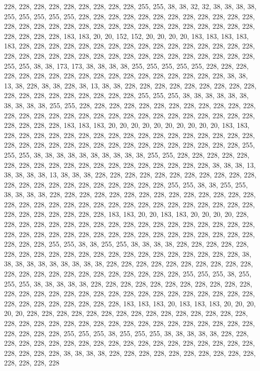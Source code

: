 {	228, 228, 228, 228, 228, 228, 228, 228, 228, 255, 255, 38,  38,  32,  32,  38,  38,  38,  38,  255, 255, 255, 255, 255, 228, 228, 228, 228, 228, 228, 228, 228, 228, 228, 228, 228, 228, 228, 228, 228, 228, 228, 228, 228, 228, 228, 228, 228, 228, 228, 228, 228, 228, 228, 228, 228, 228, 183, 183, 20,  20,  152, 152, 20,  20,  20,  20,  183, 183, 183, 183, 183, 228, 228, 228, 228, 228, 228, 228, 228, 228, 228, 228, 228, 228, 228, 228, 228, 228, 228, 228, 228, 228, 228, 228, 228, 228, 228, 228, 228, 228, 228, 228, 228, 228, 255, 255, 38,  38,  173, 173, 38,  38,  38,  38,  255, 255, 255, 255, 255, 228, 228, 228, 228, 228, 228, 228, 228, 228, 228, 228, 228, 228, 228, 228, 228, 228, 228, 38,  38,  13,  38,  228, 38,  38,  228, 38,  13,  38,  38,  228, 228, 228, 228, 228, 228, 228, 228, 228, 228, 
	228, 228, 228, 228, 228, 228, 228, 228, 255, 255, 255, 38,  38,  38,  38,  38,  38,  38,  38,  38,  38,  255, 255, 228, 228, 228, 228, 228, 228, 228, 228, 228, 228, 228, 228, 228, 228, 228, 228, 228, 228, 228, 228, 228, 228, 228, 228, 228, 228, 228, 228, 228, 228, 228, 228, 228, 183, 183, 183, 20,  20,  20,  20,  20,  20,  20,  20,  20,  20,  183, 183, 228, 228, 228, 228, 228, 228, 228, 228, 228, 228, 228, 228, 228, 228, 228, 228, 228, 228, 228, 228, 228, 228, 228, 228, 228, 228, 228, 228, 228, 228, 228, 228, 228, 255, 255, 255, 38,  38,  38,  38,  38,  38,  38,  38,  38,  38,  255, 255, 228, 228, 228, 228, 228, 228, 228, 228, 228, 228, 228, 228, 228, 228, 228, 228, 228, 228, 228, 38,  38,  38,  13,  38,  38,  38,  38,  13,  38,  38,  38,  228, 228, 228, 228, 228, 228, 228, 228, 228, 228, 
	228, 228, 228, 228, 228, 228, 228, 228, 228, 228, 228, 228, 255, 255, 38,  38,  255, 255, 38,  38,  38,  38,  228, 228, 228, 228, 228, 228, 228, 228, 228, 228, 228, 228, 228, 228, 228, 228, 228, 228, 228, 228, 228, 228, 228, 228, 228, 228, 228, 228, 228, 228, 228, 228, 228, 228, 228, 228, 228, 228, 183, 183, 20,  20,  183, 183, 20,  20,  20,  20,  228, 228, 228, 228, 228, 228, 228, 228, 228, 228, 228, 228, 228, 228, 228, 228, 228, 228, 228, 228, 228, 228, 228, 228, 228, 228, 228, 228, 228, 228, 228, 228, 228, 228, 228, 228, 228, 228, 255, 255, 38,  38,  255, 255, 38,  38,  38,  38,  228, 228, 228, 228, 228, 228, 228, 228, 228, 228, 228, 228, 228, 228, 228, 228, 228, 228, 228, 228, 228, 38,  38,  38,  38,  38,  38,  38,  38,  38,  38,  228, 228, 228, 228, 228, 228, 228, 228, 228, 228, 228, 
	228, 228, 228, 228, 228, 228, 228, 228, 228, 228, 228, 255, 255, 255, 38,  255, 255, 255, 38,  38,  38,  38,  38,  228, 228, 228, 228, 228, 228, 228, 228, 228, 228, 228, 228, 228, 228, 228, 228, 228, 228, 228, 228, 228, 228, 228, 228, 228, 228, 228, 228, 228, 228, 228, 228, 228, 228, 228, 228, 183, 183, 183, 20,  183, 183, 183, 20,  20,  20,  20,  20,  228, 228, 228, 228, 228, 228, 228, 228, 228, 228, 228, 228, 228, 228, 228, 228, 228, 228, 228, 228, 228, 228, 228, 228, 228, 228, 228, 228, 228, 228, 228, 228, 228, 228, 228, 228, 255, 255, 255, 38,  255, 255, 255, 38,  38,  38,  38,  38,  228, 228, 228, 228, 228, 228, 228, 228, 228, 228, 228, 228, 228, 228, 228, 228, 228, 228, 228, 228, 228, 228, 228, 38,  38,  38,  38,  228, 228, 228, 228, 228, 228, 228, 228, 228, 228, 228, 228, 228, 228 
}
